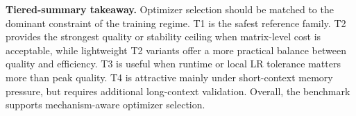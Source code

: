 \begin{takeaway}
\noindent\textbf{Tiered-summary takeaway.}
Optimizer selection should be matched to the dominant constraint of the
training regime. T1 is the safest reference family. T2 provides the strongest
quality or stability ceiling when matrix-level cost is acceptable, while lightweight
T2 variants offer a more practical balance between quality and efficiency.
T3 is useful when runtime or local LR tolerance matters more than peak quality.
T4 is attractive mainly under short-context memory pressure, but requires
additional long-context validation. Overall, the benchmark supports
mechanism-aware optimizer selection.
\end{takeaway}